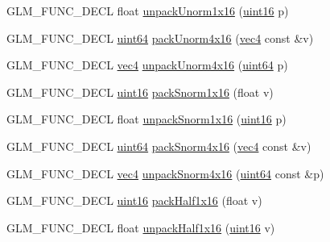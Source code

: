 \begin{DoxyCompactItemize}
\item 
G\-L\-M\-\_\-\-F\-U\-N\-C\-\_\-\-D\-E\-C\-L float \hyperlink{group__gtc__packing_ga7770e3ade4f4764cc1b2eb42ac4ec188}{unpack\-Unorm1x16} (\hyperlink{group__gtc__type__precision_gad8c2939e1fdd8e5828b31d95c52255d5}{uint16} p)
\item 
G\-L\-M\-\_\-\-F\-U\-N\-C\-\_\-\-D\-E\-C\-L \hyperlink{group__gtc__type__precision_gae3632bf9b37da66233d78930dd06378a}{uint64} \hyperlink{group__gtc__packing_gac561f06c908b7302537a8ef29fcb409e}{pack\-Unorm4x16} (\hyperlink{group__core__types_ga5881b1b022d7fd1b7218f5916532dd02}{vec4} const \&v)
\item 
G\-L\-M\-\_\-\-F\-U\-N\-C\-\_\-\-D\-E\-C\-L \hyperlink{group__core__types_ga5881b1b022d7fd1b7218f5916532dd02}{vec4} \hyperlink{group__gtc__packing_gafb2b502bc406031a5618ce930139a9e3}{unpack\-Unorm4x16} (\hyperlink{group__gtc__type__precision_gae3632bf9b37da66233d78930dd06378a}{uint64} p)
\item 
G\-L\-M\-\_\-\-F\-U\-N\-C\-\_\-\-D\-E\-C\-L \hyperlink{group__gtc__type__precision_gad8c2939e1fdd8e5828b31d95c52255d5}{uint16} \hyperlink{group__gtc__packing_gac29411d6c0f6ed0fe9f0396dfe92e0e8}{pack\-Snorm1x16} (float v)
\item 
G\-L\-M\-\_\-\-F\-U\-N\-C\-\_\-\-D\-E\-C\-L float \hyperlink{group__gtc__packing_ga246f451cebf590726324f7a283e3d65e}{unpack\-Snorm1x16} (\hyperlink{group__gtc__type__precision_gad8c2939e1fdd8e5828b31d95c52255d5}{uint16} p)
\item 
G\-L\-M\-\_\-\-F\-U\-N\-C\-\_\-\-D\-E\-C\-L \hyperlink{group__gtc__type__precision_gae3632bf9b37da66233d78930dd06378a}{uint64} \hyperlink{group__gtc__packing_ga9b237d7c66b7a71964e6d1f4dc06539f}{pack\-Snorm4x16} (\hyperlink{group__core__types_ga5881b1b022d7fd1b7218f5916532dd02}{vec4} const \&v)
\item 
G\-L\-M\-\_\-\-F\-U\-N\-C\-\_\-\-D\-E\-C\-L \hyperlink{group__core__types_ga5881b1b022d7fd1b7218f5916532dd02}{vec4} \hyperlink{group__gtc__packing_gadb01fc0530f07beb509c89d97b6f4d20}{unpack\-Snorm4x16} (\hyperlink{group__gtc__type__precision_gae3632bf9b37da66233d78930dd06378a}{uint64} const \&p)
\item 
G\-L\-M\-\_\-\-F\-U\-N\-C\-\_\-\-D\-E\-C\-L \hyperlink{group__gtc__type__precision_gad8c2939e1fdd8e5828b31d95c52255d5}{uint16} \hyperlink{group__gtc__packing_gaba534b320836a35372e00af5771dd1a2}{pack\-Half1x16} (float v)
\item 
G\-L\-M\-\_\-\-F\-U\-N\-C\-\_\-\-D\-E\-C\-L float \hyperlink{group__gtc__packing_gaa6eebcdfc746584b7d1823f1d5344fed}{unpack\-Half1x16} (\hyperlink{group__gtc__type__precision_gad8c2939e1fdd8e5828b31d95c52255d5}{uint16} v)

\end{DoxyCompactItemize}
